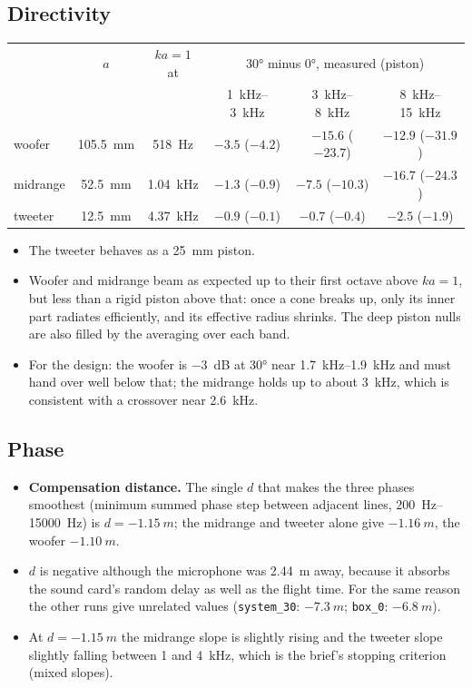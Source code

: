 \documentclass[a4paper,10pt]{article}
\begin{document}
\subsection{Directivity}
\begin{center}\small
\begin{tabular}{lccccc}
\toprule
 & $a$ & $ka=1$ at & \multicolumn{3}{c}{30° minus 0°, measured (piston)} \\
 & & & \SIrange{1}{3}{kHz} & \SIrange{3}{8}{kHz} & \SIrange{8}{15}{kHz} \\
\midrule
woofer & \SI{105.5}{mm} & \SI{518}{Hz} & $-3.5$ ($-4.2$) & $-15.6$ ($-23.7$) & $-12.9$ ($-31.9$) \\
midrange & \SI{52.5}{mm} & \SI{1.04}{kHz} & $-1.3$ ($-0.9$) & $-7.5$ ($-10.3$) & $-16.7$ ($-24.3$) \\
tweeter & \SI{12.5}{mm} & \SI{4.37}{kHz} & $-0.9$ ($-0.1$) & $-0.7$ ($-0.4$) & $-2.5$ ($-1.9$) \\
\bottomrule
\end{tabular}
\end{center}
\begin{itemize}
\item The tweeter behaves as a \SI{25}{mm} piston.
\item Woofer and midrange beam as expected up to their first octave above $ka=1$, but less than a rigid
  piston above that: once a cone breaks up, only its inner part radiates efficiently, and its
  effective radius shrinks. The deep piston nulls are also filled by the averaging over each band.
\item For the design: the woofer is \SI{-3}{dB} at 30° near \SIrange{1.7}{1.9}{kHz} and must hand over well below
  that; the midrange holds up to about \SI{3}{kHz}, which is consistent with a crossover near
  \SI{2.6}{kHz}.
\end{itemize}

\subsection{Phase}
\begin{itemize}
\item \textbf{Compensation distance.} The single $d$ that makes the three phases smoothest
  (minimum summed phase step between adjacent lines, \SIrange{200}{15000}{Hz}) is
  $d=\SI{-1.15}{m}$; the midrange and tweeter alone give $\SI{-1.16}{m}$, the woofer
  $\SI{-1.10}{m}$.
\item $d$ is negative although the microphone was \SI{2.44}{m} away, because it absorbs the sound card's
  random delay as well as the flight time. For the same reason the other runs give unrelated
  values (\texttt{system\_30}: $\SI{-7.3}{m}$; \texttt{box\_0}: $\SI{-6.8}{m}$).
\item At $d=\SI{-1.15}{m}$ the midrange slope is slightly rising and the tweeter slope slightly falling
  between \SI{1}{} and \SI{4}{kHz}, which is the brief's stopping criterion (mixed slopes).
\end{itemize}
\end{document}
